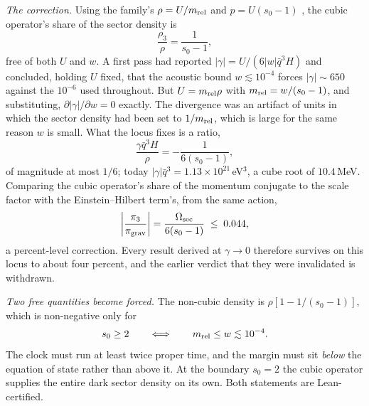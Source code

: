 \documentclass[11pt,letterpaper]{article}
\begin{document}
\emph{The correction.} Using the family's $\rho=U/m_{\rm rel}$ and $p=U(s_0-1)$ \cite{paper21}, the cubic operator's share of the sector density is
\begin{equation}
\frac{\rho_3}{\rho}=\frac{1}{s_0-1},
\end{equation}
free of both $U$ and $w$. A first pass had reported $|\gamma|=U/(6|w|\bar q^3H)$ and concluded, holding $U$ fixed, that the acoustic bound $w\lesssim10^{-4}$ forces $|\gamma|\sim650$ against the $10^{-6}$ used throughout. But $U=m_{\rm rel}\rho$ with $m_{\rm rel}=w/(s_0-1)$, and substituting, $\partial|\gamma|/\partial w=0$ exactly. The divergence was an artifact of units in which the sector density had been set to $1/m_{\rm rel}$, which is large for the same reason $w$ is small. What the locus fixes is a ratio,
\begin{equation}
\frac{\gamma\bar q^3H}{\rho}=-\frac{1}{6(s_0-1)},
\end{equation}
of magnitude at most $1/6$; today $|\gamma|\bar q^3=1.13\times10^{21}\,$eV$^3$, a cube root of $10.4\,$MeV. Comparing the cubic operator's share of the momentum conjugate to the scale factor with the Einstein--Hilbert term's, from the same action,
\begin{equation}
\left|\frac{\pi_3}{\pi_{\rm grav}}\right|=\frac{\Omega_{\rm sec}}{6(s_0-1)}\;\le\;0.044 ,
\end{equation}
a percent-level correction. Every result derived at $\gamma\to0$ therefore survives on this locus to about four percent, and the earlier verdict that they were invalidated is withdrawn.

\emph{Two free quantities become forced.} The non-cubic density is $\rho[1-1/(s_0-1)]$, which is non-negative only for
\begin{equation}
s_0\ge2\qquad\Longleftrightarrow\qquad m_{\rm rel}\le w\lesssim10^{-4}.
\end{equation}
The clock must run at least twice proper time, and the margin must sit \emph{below} the equation of state rather than above it. At the boundary $s_0=2$ the cubic operator supplies the entire dark sector density on its own. Both statements are Lean-certified.
\end{document}
